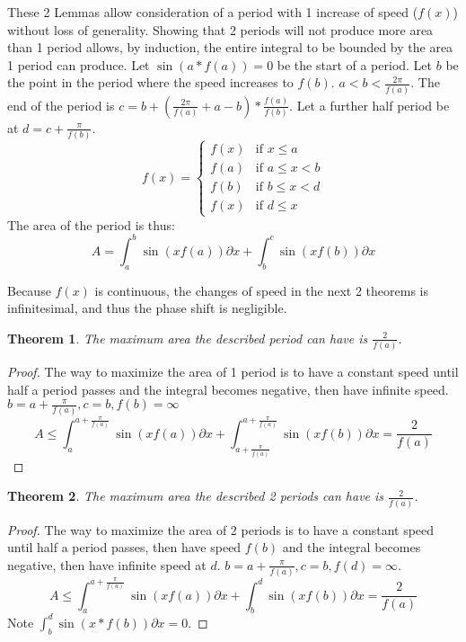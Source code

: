 \documentclass[]{article}
\newcommand{\pqty}[1]{{\left(#1\right)}}
\newtheorem{theorem}{Theorem}[section]
\numberwithin{equation}{section}
\begin{document}
	These 2 Lemmas allow consideration of a period with 1 increase of speed (\(f\pqty{x}\)) without loss of generality. Showing that 2 periods will not produce more area than 1 period allows, by induction, the entire integral to be bounded by the area 1 period can produce.
	Let \(\sin\pqty{a*f\pqty{a}}=0\) be the start of a period. Let \(b\) be the point in the period where the speed increases to \(f\pqty{b}\). \(a<b<\frac{2\pi}{f\pqty{a}}\). The end of the period is \(c=b + \pqty{\frac{2\pi}{f\pqty{a}} + a - b}*\frac{f\pqty{a}}{f\pqty{b}}\). Let a further half period be at \(d=c+\frac{\pi}{f\pqty{b}}\).
	\begin{equation}
	f\pqty{x}=
	\begin{cases}
	f\pqty{x} & \text{if } x \leq a\\
	f\pqty{a} & \text{if } a \leq x < b\\
	f\pqty{b} & \text{if } b \leq x < d\\
	f\pqty{x} & \text{if } d \leq x
	\end{cases}
	\end{equation}
	The area of the period is thus:
	\begin{equation}
	A=
	\int_{a}^{b}\sin\pqty{xf\pqty{a}}\partial x+
	\int_{b}^{c}\sin\pqty{xf\pqty{b}}\partial x
	\end{equation}
	
	Because \(f\pqty{x}\) is continuous, the changes of speed in the next 2 theorems is infinitesimal, and thus the phase shift is negligible.
	
	\begin{theorem}
		The maximum area the described period can have is \(\frac{2}{f\pqty{a}}\).
	\end{theorem}
	\begin{proof}
		The way to maximize the area of 1 period is to have a constant speed until half a period passes and the integral becomes negative, then have infinite speed. \(b=a+\frac{\pi}{f\pqty{a}},c=b,f\pqty{b}=\infty\)
		\begin{equation}
		A \leq \int_{a}^{a+\frac{\pi}{f\pqty{a}}}\sin\pqty{xf\pqty{a}}\partial x
		+\int_{a+\frac{\pi}{f\pqty{a}}}^{a+\frac{\pi}{f\pqty{a}}}\sin\pqty{xf\pqty{b}}\partial x
		=\frac{2}{f\pqty{a}}
		\end{equation}
	\end{proof}
	\begin{theorem}
	The maximum area the described 2 periods can have is \(\frac{2}{f\pqty{a}}\).
	\end{theorem}
	\begin{proof}
	The way to maximize the area of 2 periods is to have a constant speed until half a period passes, then have speed \(f\pqty{b}\) and the integral becomes negative, then have infinite speed at \(d\). \(b=a+\frac{\pi}{f\pqty{a}},c=b,f\pqty{d}=\infty\).
	\begin{equation}
	A \leq \int_{a}^{a+\frac{\pi}{f\pqty{a}}}\sin\pqty{xf\pqty{a}}\partial x
	+\int_{b}^{d}\sin\pqty{xf\pqty{b}}\partial x
	=\frac{2}{f\pqty{a}}
	\end{equation}
	Note \(\int_{b}^{d}\sin\pqty{x*f\pqty{b}}\partial x=0\).
	\end{proof}
	
\end{document}
